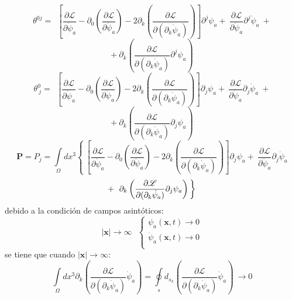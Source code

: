 \documentclass[a4paper,12pt]{article}
\begin{document}
\begin{equation}
\theta^{0j}= \ \ \left[\frac{\partial \mathscr{L} }{\partial\dot\psi_a}-\partial_{0}\left(\frac{\partial\mathscr{L} }{\partial\ddot\psi_a}  \right)-2\partial_{k}\left(\frac{\partial\mathscr{L} }{\partial(\partial_{k}\dot\psi_a)}  \right) \right]\partial^j\psi_a +\ \frac{\partial\mathscr{L} }{\partial\ddot\psi_a}\partial^j\dot\psi_a\ +
\end{equation}
$$+\ \partial_k\left(\frac{\partial\mathscr{L} }{\partial(\partial_k\dot\psi_a)}\partial^j\psi_a\right) $$
\begin{equation}
\theta^{0}_{\ j}= \ \ \left[\frac{\partial \mathscr{L} }{\partial\dot\psi_a}-\partial_{0}\left(\frac{\partial\mathscr{L} }{\partial\ddot\psi_a}  \right)-2\partial_{k}\left(\frac{\partial\mathscr{L} }{\partial(\partial_{k}\dot\psi_a)}  \right) \right]\partial_j\psi_a +\ \frac{\partial\mathscr{L} }{\partial\ddot\psi_a}\partial_j\dot\psi_a\ +
\label{temoen} 
\end{equation}
$$+\ \partial_k\left(\frac{\partial\mathscr{L} }{\partial(\partial_k\dot\psi_a)}\partial_j\psi_a\right)$$
\begin{equation}
\mathbf{P}=P_{j}=\int\limits_{\Omega}dx^{3}\left\{ \ \left[\frac{\partial \mathscr{L} }{\partial\dot\psi_a}-\partial_{0}\left(\frac{\partial\mathscr{L} }{\partial\ddot\psi_a}  \right)-2\partial_{k}\left(\frac{\partial\mathscr{L} }{\partial(\partial_{k}\dot\psi_a)}  \right) \right]\partial_j\psi_a +\ \frac{\partial\mathscr{L} }{\partial\ddot\psi_a}\partial_j\dot\psi_a\right.
\end{equation}
$$+\left.\ \partial_k\left(\frac{\partial\mathscr{L} }{\partial(\partial_k\dot\psi_a)}\partial_j\psi_a\right)\\ \right\} $$
debido a la condición de campos asintóticos:
\begin{equation}
|\textbf{x}|\rightarrow\infty \ \ \ \left\{ \begin{array}{lcl}
\psi_a(\textbf{x},t)\rightarrow0 \\
\dot \psi_a(\textbf{x},t)\rightarrow0 \\
\end{array}
\right.
\end{equation}
se tiene que cuando $|\textbf{x}|\rightarrow\infty$:
\begin{equation}
\int\limits_{\Omega}dx^{3}\partial_k\left(\frac{\partial\mathscr{L} }{\partial(\partial_{k}\dot \psi_a)}\dot\psi_a\right)=\oint\limits_{s}d_{s_k}\left(\frac{\partial\mathscr{L} }{\partial(\partial_{k}\dot \psi_a)}\dot\psi_a\right)\ \rightarrow0 
\end{equation}
\end{document}
